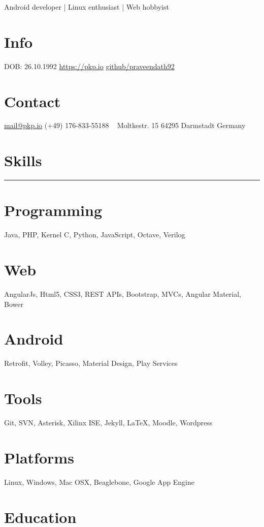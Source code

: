 \documentclass[]{friggeri-cv}
\begin{document}
       {Android developer | Linux enthusiast | Web hobbyist}

\begin{aside}
  \section{Info}
    DOB: 26.10.1992
    \href{https://pkp.io}{https://pkp.io}
    \href{http://github.com/praveendath92}{github/praveendath92}
  \section{Contact}
    \href{mailto:mail@pkp.io}{mail@pkp.io}
    (+49) 176-833-55188
    ~
    Moltkestr. 15
    64295 Darmstadt
    Germany
    ~
  \section{Skills}
    \noindent\rule{3cm}{0.5pt}
  \section{Programming}
    Java, PHP, Kernel C, Python, JavaScript, Octave, Verilog
  \section{Web}
    AngularJs, Html5, CSS3, REST APIs, Bootstrap, MVCs, Angular Material, Bower
  \section{Android}
    Retrofit, Volley, Picasso, Material Design, Play Services
  \section{Tools}
    Git, SVN, Asterisk, Xilinx ISE, Jekyll, \LaTeX, Moodle, Wordpress
  \section{Platforms}
    Linux, Windows, Mac OSX, Beaglebone, Google App Engine
\end{aside}


\section{Education}
\end{document}
